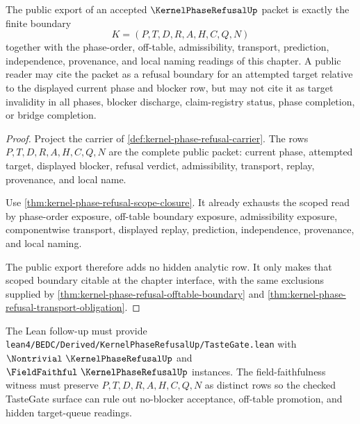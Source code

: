 \begin{theorem}
\label{thm:kernel-phase-refusal-public-export-boundary}
The public export of an accepted $\KernelPhaseRefusalUp$ packet is exactly the finite boundary
$$
K=(P,T,D,R,A,H,C,Q,N)
$$
together with the phase-order, off-table, admissibility, transport, prediction, independence, provenance, and local naming readings of this chapter. A public reader may cite the packet as a refusal boundary for an attempted target relative to the displayed current phase and blocker row, but may not cite it as target invalidity in all phases, blocker discharge, claim-registry status, phase completion, or bridge completion.
\end{theorem}
\begin{proof}
Project the carrier of \autoref{def:kernel-phase-refusal-carrier}. The rows $P,T,D,R,A,H,C,Q,N$ are the complete public packet: current phase, attempted target, displayed blocker, refusal verdict, admissibility, transport, replay, provenance, and local name.

Use \autoref{thm:kernel-phase-refusal-scope-closure}. It already exhausts the scoped read by phase-order exposure, off-table boundary exposure, admissibility exposure, componentwise transport, displayed replay, prediction, independence, provenance, and local naming.

The public export therefore adds no hidden analytic row. It only makes that scoped boundary citable at the chapter interface, with the same exclusions supplied by \autoref{thm:kernel-phase-refusal-offtable-boundary} and \autoref{thm:kernel-phase-refusal-transport-obligation}.
\end{proof}



The Lean follow-up must provide \texttt{lean4/BEDC/Derived/KernelPhaseRefusalUp/TasteGate.lean} with $\Nontrivial\ \KernelPhaseRefusalUp$ and $\FieldFaithful\ \KernelPhaseRefusalUp$ instances. The field-faithfulness witness must preserve $P,T,D,R,A,H,C,Q,N$ as distinct rows so the checked TasteGate surface can rule out no-blocker acceptance, off-table promotion, and hidden target-queue readings.

